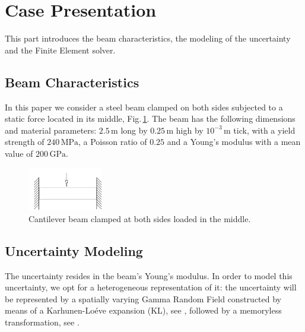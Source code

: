 \documentclass{ICASP13Paper}
\begin{document}
\section{Case Presentation}
This part introduces the beam characteristics, the modeling of the uncertainty and the Finite Element solver.

\subsection{Beam Characteristics}
In this paper we consider a steel beam clamped on both sides subjected to a static force located in its middle, Fig.\,\ref{fig:bean_configurations}. The beam has the following dimensions and material parameters: $2.5\,\mathrm{m}$ long by $0.25\,\mathrm{m}$ high by $10^{-3}\,\mathrm{m}$ tick, with a yield strength of $240\,\mathrm{MPa}$, a Poisson ratio of $0.25$ and a Young's modulus with a mean value of $200\,\mathrm{GPa}$.


\begin{figure}[h]
\centering
\includegraphics[height=1.9cm]{DoubleClampedBeam.pdf}
\caption{Cantilever beam clamped at both sides loaded in the middle.}
\label{fig:bean_configurations}
\end{figure}

\subsection{Uncertainty Modeling}
The uncertainty resides in the beam's Young's modulus. In order to model this uncertainty, we opt for a heterogeneous representation of it: the uncertainty will be represented by a spatially varying Gamma Random Field constructed by means of a Karhunen-Lo\'eve expansion (KL), see \cite{Loeve}, followed by a memoryless transformation, see \cite{Grigoriu}.
\end{document}
